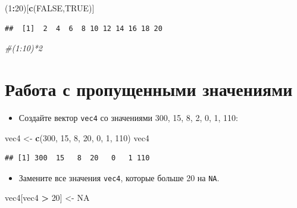 \documentclass[]{book}
\newenvironment{Shaded}{\begin{snugshade}}{\end{snugshade}}
\newcommand{\KeywordTok}[1]{\textcolor[rgb]{0.13,0.29,0.53}{\textbf{#1}}}
\newcommand{\DecValTok}[1]{\textcolor[rgb]{0.00,0.00,0.81}{#1}}
\newcommand{\StringTok}[1]{\textcolor[rgb]{0.31,0.60,0.02}{#1}}
\newcommand{\CommentTok}[1]{\textcolor[rgb]{0.56,0.35,0.01}{\textit{#1}}}
\newcommand{\OtherTok}[1]{\textcolor[rgb]{0.56,0.35,0.01}{#1}}
\newcommand{\OperatorTok}[1]{\textcolor[rgb]{0.81,0.36,0.00}{\textbf{#1}}}
\newcommand{\NormalTok}[1]{#1}
\providecommand{\tightlist}{%
  \setlength{\itemsep}{0pt}\setlength{\parskip}{0pt}}
\begin{document}
\begin{Shaded}
\begin{Highlighting}[]
\NormalTok{(}\DecValTok{1}\OperatorTok{:}\DecValTok{20}\NormalTok{)[}\KeywordTok{c}\NormalTok{(}\OtherTok{FALSE}\NormalTok{,}\OtherTok{TRUE}\NormalTok{)]}
\end{Highlighting}
\end{Shaded}

\begin{verbatim}
##  [1]  2  4  6  8 10 12 14 16 18 20
\end{verbatim}

\begin{Shaded}
\begin{Highlighting}[]
\CommentTok{#(1:10)*2}
\end{Highlighting}
\end{Shaded}

\section{Работа с пропущенными значениями}\label{solution_na}

\begin{itemize}
\tightlist
\item
  Создайте вектор \texttt{vec4} со значениями 300, 15, 8, 2, 0, 1, 110:
\end{itemize}

\begin{Shaded}
\begin{Highlighting}[]
\NormalTok{vec4 <-}\StringTok{ }\KeywordTok{c}\NormalTok{(}\DecValTok{300}\NormalTok{, }\DecValTok{15}\NormalTok{, }\DecValTok{8}\NormalTok{, }\DecValTok{20}\NormalTok{, }\DecValTok{0}\NormalTok{, }\DecValTok{1}\NormalTok{, }\DecValTok{110}\NormalTok{)}
\NormalTok{vec4}
\end{Highlighting}
\end{Shaded}

\begin{verbatim}
## [1] 300  15   8  20   0   1 110
\end{verbatim}

\begin{itemize}
\tightlist
\item
  Замените все значения \texttt{vec4}, которые больше 20 на \texttt{NA}.
\end{itemize}

\begin{Shaded}
\begin{Highlighting}[]
\NormalTok{vec4[vec4 }\OperatorTok{>}\StringTok{ }\DecValTok{20}\NormalTok{] <-}\StringTok{ }\OtherTok{NA}
\end{Highlighting}
\end{Shaded}
\end{document}

